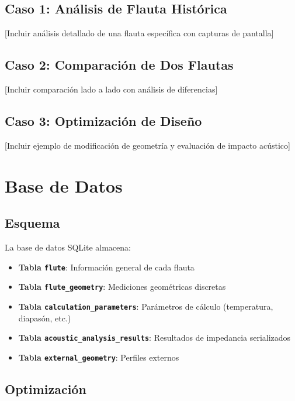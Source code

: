 \documentclass[12pt,a4paper,twocolumn]{article}
\begin{document}
\subsection{Caso 1: Análisis de Flauta Histórica}

[Incluir análisis detallado de una flauta específica con capturas de pantalla]

\subsection{Caso 2: Comparación de Dos Flautas}

[Incluir comparación lado a lado con análisis de diferencias]

\subsection{Caso 3: Optimización de Diseño}

[Incluir ejemplo de modificación de geometría y evaluación de impacto acústico]

\section{Base de Datos}

\subsection{Esquema}

La base de datos SQLite almacena:

\begin{itemize}
    \item \textbf{Tabla \texttt{flute}}: Información general de cada flauta
    \item \textbf{Tabla \texttt{flute\_geometry}}: Mediciones geométricas discretas
    \item \textbf{Tabla \texttt{calculation\_parameters}}: Parámetros de cálculo (temperatura, diapasón, etc.)
    \item \textbf{Tabla \texttt{acoustic\_analysis\_results}}: Resultados de impedancia serializados
    \item \textbf{Tabla \texttt{external\_geometry}}: Perfiles externos
\end{itemize}

\subsection{Optimización}
\end{document}
